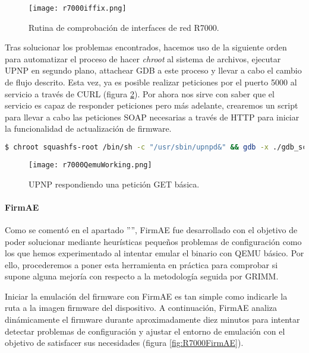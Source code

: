 \begin{figure}[H]
    \centering
    \texttt{[image: r7000iffix.png]}
    \caption{Rutina de comprobación de interfaces de red R7000.}
    \label{fig:R7000iffix}
\end{figure}

Tras solucionar los problemas encontrados, hacemos uso de la siguiente orden para automatizar el proceso de hacer \textit{chroot}
al sistema de archivos, ejecutar UPNP en segundo plano, attachear GDB a este proceso y llevar a cabo el cambio de flujo descrito.
Esta vez, ya es posible realizar peticiones por el puerto 5000 al servicio a través de CURL (figura \ref{fig:R7000QemuWorking}). Por ahora nos sirve 
con saber que el servicio es capaz de responder peticiones pero más adelante, crearemos un script para llevar a cabo las peticiones 
SOAP necesarias a través de HTTP para iniciar la funcionalidad de actualización de firmware.

\begin{lstlisting}[language=bash, breaklines]
    $ chroot squashfs-root /bin/sh -c "/usr/sbin/upnpd&" && gdb -x ./gdb_script -q -p `pgrep upnpd`
\end{lstlisting}

\begin{figure}[H]
    \centering
    \texttt{[image: r7000QemuWorking.png]}
    \caption{UPNP respondiendo una petición GET básica.}
    \label{fig:R7000QemuWorking}
\end{figure}

\paragraph{FirmAE}
Como se comentó en el apartado '''', FirmAE fue desarrollado con el objetivo de poder solucionar mediante heurísticas 
pequeños problemas de configuración como los que hemos experimentado al intentar emular el binario con QEMU básico. Por ello, 
procederemos a poner esta herramienta en práctica para comprobar si supone alguna mejoría con respecto a la metodología seguida
por GRIMM\cite{r7000GRIMM}.\bigskip

Iniciar la emulación del firmware con FirmAE es tan simple como indicarle la ruta a la imagen firmware del dispositivo. A continuación, 
FirmAE analiza dinámicamente el firmware durante aproximadamente diez minutos para intentar detectar problemas de configuración y 
ajustar el entorno de emulación con el objetivo de satisfacer sus necesidades (figura \ref{fig:R7000FirmAE}). 

